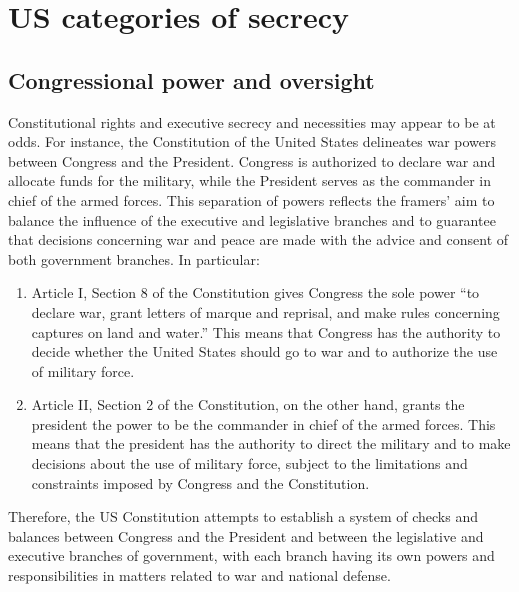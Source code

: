 %
%
%


\chapter{US categories of secrecy}
\label{2023-UFO-Appendix-USCOS} %





\section{Congressional power and oversight}
\label{2023-UFO-part-Perception-crash-retreivals-cpao}



Constitutional rights and executive secrecy and necessities may appear to be at odds. For instance, the Constitution of the United States delineates war powers between Congress and the President. Congress is authorized to declare war and allocate funds for the military, while the President serves as the commander in chief of the armed forces. This separation of powers reflects the framers' aim to balance the influence of the executive and legislative branches and to guarantee that decisions concerning war and peace are made with the advice and consent of both government branches.
In particular:
\begin{enumerate}
\item
Article I, Section 8 of the Constitution gives Congress the sole power ``to declare war, grant letters of marque and reprisal, and make rules concerning captures on land and water.'' This means that Congress has the authority to decide whether the United States should go to war and to authorize the use of military force.
\item
Article II, Section 2 of the Constitution, on the other hand, grants the president the power to be the commander in chief of the armed forces. This means that the president has the authority to direct the military and to make decisions about the use of military force, subject to the limitations and constraints imposed by Congress and the Constitution.
\end{enumerate}
Therefore, the US Constitution attempts to establish a system of checks and balances between Congress and the President and between the legislative and executive branches of government, with each branch having its own powers and responsibilities in matters related to war and national defense.

